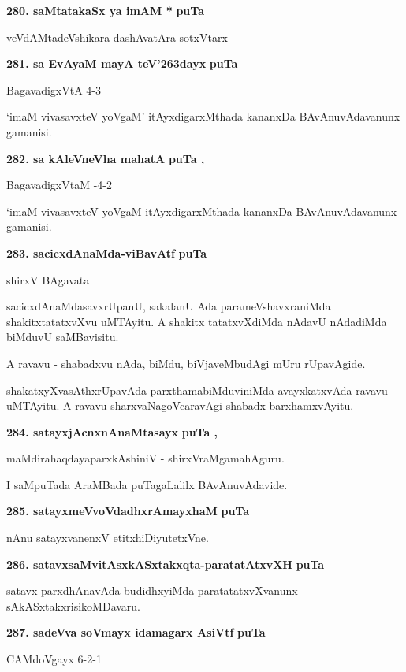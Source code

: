 \medskip
\noindent
\textbf{280. saMtatakaSx ya imAM *} \hfill{\bf puTa \pageref{213}}

\hfill{veVdAMtadeVshikara dashAvatAra sotxVtarx}

\medskip
\noindent
\textbf{281. sa EvAyaM mayA teV\char'263dayx} \hfill{\bf puTa \pageref{107}}

\hfill{BagavadigxVtA 4-3}

\smallskip
`imaM vivasavxteV yoVgaM' itAyxdigarxMthada kananxDa BAvAnuvAdavanunx gamanisi.

\medskip
\noindent
\textbf{282. sa kAleVneVha mahatA} \hfill{\bf puTa \pageref{70}, \pageref{62}}

\hfill{BagavadigxVtaM -4-2}

\smallskip
`imaM vivasavxteV yoVgaM itAyxdigarxMthada kananxDa BAvAnuvAdavanunx gamanisi.

\medskip
\noindent
\textbf{283. sacicxdAnaMda-viBavAtf} \hfill{\bf puTa \pageref{157d}}

\hfill{shirxV BAgavata}

\smallskip
sacicxdAnaMdasavxrUpanU, sakalanU Ada parameVshavxraniMda shakitxtatatxvXvu uMTA\-yitu. A shakitx tatatxvX\-diMda nAdavU nAdadiMda biMduvU saMBavisitu.

A ravavu - shabadxvu nAda, biMdu, biVjaveMbudAgi mUru rUpavAgide.

shakatxyXvasAthxrUpavAda parxthamabiMduviniMda avayxkatxvAda ravavu uMTAyitu. A ravavu sharxvaNa\-goVcara\-vAgi shabadx barxhamxvAyitu.

\medskip
\noindent
\textbf{284. satayxjAcnxnAnaMtasayx} \hfill{\bf puTa \pageref{81}, \pageref{103}}

\hfill{maMdirahaqdayaparxkAshiniV - shirxVraMgamahAguru.}

\smallskip
I saMpuTada AraMBada puTagaLalilx BAvAnuvAdavide.

\medskip
\noindent
\textbf{285. satayxmeVvoVdadhxrAmayxhaM} \hfill{\bf puTa \pageref{92}}

\smallskip
nAnu satayxvanenxV etitxhiDiyutetxVne.

\medskip
\noindent
\textbf{286. satavxsaMvitAsxkASxtakxqta-paratatAtxvXH} \hfill{\bf puTa \pageref{48}}

\smallskip
satavx parxdhAnavAda budidhxyiMda paratatatxvXvanunx sAkASxtakxrisikoMDavaru.

\medskip
\noindent
\textbf{287. sadeVva soVmayx idamagarx AsiVtf} \hfill{\bf puTa \pageref{74}}

\hfill{CAMdoVgayx 6-2-1}

